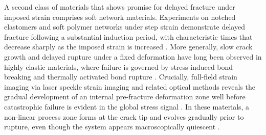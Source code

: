 A second class of materials that shows promise for delayed fracture under imposed strain comprises soft network materials. Experiments on notched elastomers and soft polymer networks under step strain demonstrate delayed fracture following a substantial induction period, with characteristic times that decrease sharply as the imposed strain is increased \cite{van_der_kooij_laser_2018,wangDelayedFractureGels2012,Ju2023}. More generally, slow crack growth and delayed rupture under a fixed deformation have long been observed in highly elastic materials, where failure is governed by stress-induced bond breaking \cite{Fan2024,Sanoja2021,Creton2016} and thermally activated bond rupture \cite{Wang2023,Persson2024,Baumberger2009,Hui2004,Creton2016}. Crucially, full-field strain imaging via laser speckle strain imaging and related optical methods reveals the gradual development of an internal pre-fracture deformation zone well before catastrophic failure is evident in the global stress signal \cite{van_der_kooij_laser_2018,Wang2023,ju_role_nodate,Ju2023}. In these materials, a non-linear process zone forms at the crack tip and evolves gradually prior to rupture, even though the system appears macroscopically quiescent \cite{van_der_kooij_laser_2018,Wang2023}.


